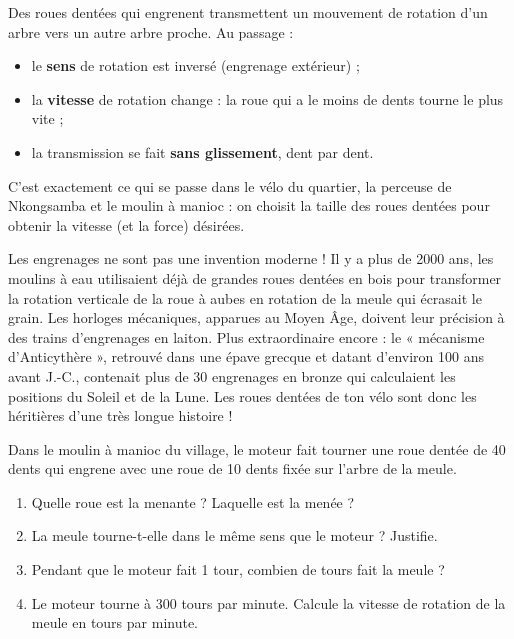 \documentclass[11pt]{article}
\newcommand{\cle}[1]{{\popxbold\color{popdark}#1}}
\newcounter{popsec}
\newcounter{popsub}
\newcommand{\courssub}[1]{%
  \stepcounter{popsub}%
  \par\vspace{9pt}\noindent{\popxbold\fontsize{11.5}{13}\selectfont\color{popink}{\color{poporange}\thepopsec.\thepopsub}\hspace{6pt}#1}\par\nopagebreak\vspace{4pt}
}
\begin{document}
\courssub{Conclusion de la découverte}

\begin{aretenir}
Des roues dentées qui engrenent \cle{transmettent un mouvement de rotation} d'un arbre vers un autre arbre proche. Au passage :
\begin{itemize}
\item le \textbf{sens} de rotation est inversé (engrenage extérieur) ;
\item la \textbf{vitesse} de rotation change : la roue qui a le moins de dents tourne le plus vite ;
\item la transmission se fait \textbf{sans glissement}, dent par dent.
\end{itemize}
C'est exactement ce qui se passe dans le vélo du quartier, la perceuse de Nkongsamba et le moulin à manioc : on choisit la taille des roues dentées pour obtenir la vitesse (et la force) désirées.
\end{aretenir}

\begin{savaistu}
Les engrenages ne sont pas une invention moderne ! Il y a plus de 2000 ans, les moulins à eau utilisaient déjà de grandes roues dentées en bois pour transformer la rotation verticale de la roue à aubes en rotation de la meule qui écrasait le grain. Les horloges mécaniques, apparues au Moyen Âge, doivent leur précision à des trains d'engrenages en laiton. Plus extraordinaire encore : le « mécanisme d'Anticythère », retrouvé dans une épave grecque et datant d'environ 100 ans avant J.-C., contenait plus de 30 engrenages en bronze qui calculaient les positions du Soleil et de la Lune. Les roues dentées de ton vélo sont donc les héritières d'une très longue histoire !
\end{savaistu}

\begin{exercice}
Dans le moulin à manioc du village, le moteur fait tourner une roue dentée de 40 dents qui engrene avec une roue de 10 dents fixée sur l'arbre de la meule.
\begin{enumerate}
\item Quelle roue est la menante ? Laquelle est la menée ?
\item La meule tourne-t-elle dans le même sens que le moteur ? Justifie.
\item Pendant que le moteur fait 1 tour, combien de tours fait la meule ?
\item Le moteur tourne à 300 tours par minute. Calcule la vitesse de rotation de la meule en tours par minute.
\end{enumerate}
\end{exercice}
\end{document}
